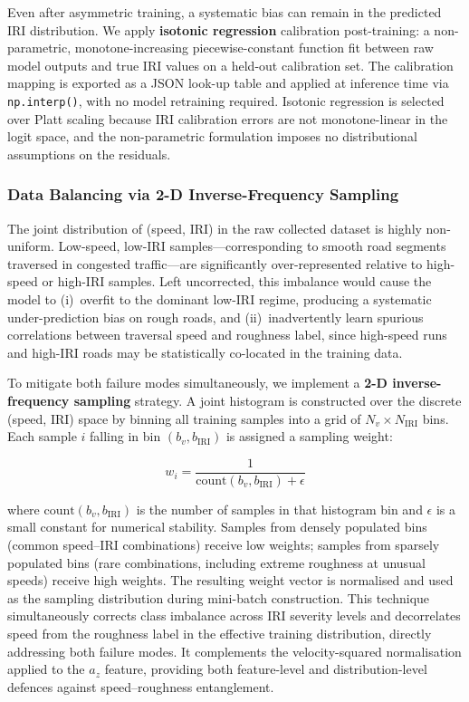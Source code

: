 \documentclass[conference]{IEEEtran}
\begin{document}
Even after asymmetric training, a systematic bias can remain in the predicted IRI distribution.
We apply \textbf{isotonic regression} calibration post-training: a non-parametric, monotone-increasing piecewise-constant function fit between raw model outputs and true IRI values on a held-out calibration set.
The calibration mapping is exported as a JSON look-up table and applied at inference time via \texttt{np.interp()}, with no model retraining required.
Isotonic regression is selected over Platt scaling because IRI calibration errors are not monotone-linear in the logit space, and the non-parametric formulation imposes no distributional assumptions on the residuals.

\subsubsection{Data Balancing via 2-D Inverse-Frequency Sampling}

The joint distribution of (speed, IRI) in the raw collected dataset is highly non-uniform.
Low-speed, low-IRI samples---corresponding to smooth road segments traversed in congested traffic---are significantly over-represented relative to high-speed or high-IRI samples.
Left uncorrected, this imbalance would cause the model to (i)~overfit to the dominant low-IRI regime, producing a systematic under-prediction bias on rough roads, and (ii)~inadvertently learn spurious correlations between traversal speed and roughness label, since high-speed runs and high-IRI roads may be statistically co-located in the training data.

To mitigate both failure modes simultaneously, we implement a \textbf{2-D inverse-frequency sampling} strategy.
A joint histogram is constructed over the discrete (speed, IRI) space by binning all training samples into a grid of $N_v \times N_{\text{IRI}}$ bins.
Each sample $i$ falling in bin $(b_v, b_{\text{IRI}})$ is assigned a sampling weight:

\begin{equation}
\label{eq:sampling_weight}
w_i = \frac{1}{\text{count}(b_v, b_{\text{IRI}}) + \epsilon}
\end{equation}

where $\text{count}(b_v, b_{\text{IRI}})$ is the number of samples in that histogram bin and $\epsilon$ is a small constant for numerical stability.
Samples from densely populated bins (common speed--IRI combinations) receive low weights;
samples from sparsely populated bins (rare combinations, including extreme roughness at unusual speeds) receive high weights.
The resulting weight vector is normalised and used as the sampling distribution during mini-batch construction.
This technique simultaneously corrects class imbalance across IRI severity levels and decorrelates speed from the roughness label in the effective training distribution, directly addressing both failure modes.
It complements the velocity-squared normalisation applied to the $a_z$ feature, providing both feature-level and distribution-level defences against speed--roughness entanglement.
\end{document}
